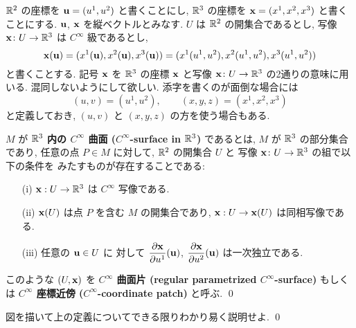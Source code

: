 \documentclass[12pt,twoside]{jarticle}
\begin{document}
${\mathbb R}^2$ の座標を ${\mathbf u}=(u^1,u^2)$ と書くことにし, 
$\R^3$ の座標を ${\mathbf x}=(x^1,x^2,x^3)$ と書くことにする.
${\mathbf u}$, ${\mathbf x}$ を縦ベクトルとみなす.
$U$ は ${\mathbb R}^2$ の開集合であるとし, 
写像 ${\mathbf x}\colon U \to {\mathbb R}^3$ は $C^\infty$ 級であるとし, 
\begin{equation*}
 {\mathbf x}({\mathbf u}) = (x^1({\mathbf u}), x^2({\mathbf u}), x^3({\mathbf u})) 
  = (x^1(u^1,u^2), x^2(u^1,u^2), x^3(u^1,u^2))
\end{equation*}
と書くことする. 記号 ${\mathbf x}$ を $\R^3$ の座標 ${\mathbf x}$ と写像 ${\mathbf x}\colon U \to {\mathbb R}^3$ 
の2通りの意味に用いる. 混同しないようにして欲しい. 
添字を書くのが面倒な場合には
\begin{equation*}
 (u,v) = (u^1,u^2), \qquad (x,y,z) = (x^1,x^2,x^3)
\end{equation*}
と定義しておき, $(u,v)$ と $(x,y,z)$ の方を使う場合もある.

\begin{definition}[$\R^3$ 内の $C^\infty$ 曲面]
 \label{def:surface}
 $M$ が {\bf $\R^3$ 内の $C^\infty$ 曲面 ($C^\infty$-surface in $\R^3$)}
 であるとは, $M$ が $\R^3$ の部分集合であり, 
 任意の点 $P\in M$ に対して, ${\mathbb R}^2$ の開集合 $U$ と %
 写像 ${\mathbf x}\colon U \to {\mathbb R}^3$ の組で以下の条件を
 みたすものが存在することである:
 \begin{enumerate}
  \item[(i)] ${\mathbf x}:U\to{\mathbb R}^3$ は $C^\infty$ 写像である.
  \item[(ii)] ${\mathbf x}(U)$ は点 $P$ を含む $M$ の開集合であり, 
   ${\mathbf x}:U\to{\mathbf x}(U)$ は同相写像である.
  \item[(iii)] 任意の ${\mathbf u}\in U$ に
   対して $\dfrac{\partial{\mathbf x}}{\partial u^1}({\mathbf u})$, $\dfrac{\partial{\mathbf x}}{\partial u^2}({\mathbf u})$ は一次独立である.
 \end{enumerate}
 このような $(U,{\mathbf x})$ を {\bf $C^\infty$ 曲面片 
 (regular parametrized $C^\infty$-surface)} もしくは
 {\bf $C^\infty$ 座標近傍 ($C^\infty$-coordinate patch)} と呼ぶ.
 \qed
\end{definition}

\begin{question}
 図を描いて上の定義についてできる限りわかり易く説明せよ. 
 \qed
\end{question}
\end{document}
